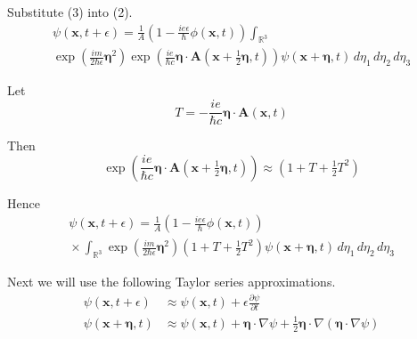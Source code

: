 \documentclass[12pt]{article}
\newcommand\INT{\int_{\mathbb R^3}}
\begin{document}
Substitute (3) into (2).
\begin{multline*}
\psi(\mathbf x,t+\epsilon)=
\frac{1}{A}\left(1-\frac{ie\epsilon}{\hbar}\phi\left(\mathbf x,t\right)\right)\INT
\\
\exp\left(\frac{im}{2\hbar\epsilon}\boldsymbol\eta^2\right)
\exp\left(\frac{ie}{\hbar c}\boldsymbol\eta\cdot\mathbf A\left(\mathbf x+\tfrac{1}{2}\boldsymbol\eta,t\right)\right)
\psi(\mathbf x+\boldsymbol\eta,t)
\,d\eta_1\,d\eta_2\,d\eta_3
\end{multline*}


Let
\begin{equation*}
T=-\frac{ie}{\hbar c}\boldsymbol\eta\cdot\mathbf A(\mathbf x,t)
\end{equation*}

Then
\begin{equation*}
\exp\left(\frac{ie}{\hbar c}\boldsymbol\eta\cdot\mathbf A\left(\mathbf x+\tfrac{1}{2}\boldsymbol\eta,t\right)\right)
\approx
\left(1+T+\tfrac{1}{2}T^2\right)
\end{equation*}

Hence
\begin{multline*}
\psi(\mathbf x,t+\epsilon)=
\frac{1}{A}
\left(1-\frac{ie\epsilon}{\hbar}\phi\left(\mathbf x,t\right)\right)
\\
{}\times\INT\exp\left(\frac{im}{2\hbar\epsilon}\boldsymbol\eta^2\right)
\left(1+T+\tfrac{1}{2}T^2\right)
\psi(\mathbf x+\boldsymbol\eta,t)
\,d\eta_1\,d\eta_2\,d\eta_3
\tag{4}
\end{multline*}

Next we will use the following Taylor series approximations.
\begin{equation*}
\begin{aligned}
\psi(\mathbf x,t+\epsilon)&\approx\psi(\mathbf x,t)+\epsilon\frac{\partial\psi}{\partial t}
\\
\psi(\mathbf x+\boldsymbol\eta,t)&\approx\psi(\mathbf x,t)+\boldsymbol\eta\cdot\nabla\psi
+\tfrac{1}{2}\boldsymbol\eta\cdot\nabla(\boldsymbol\eta\cdot\nabla\psi)
\end{aligned}
\tag{5}
\end{equation*}
\end{document}
